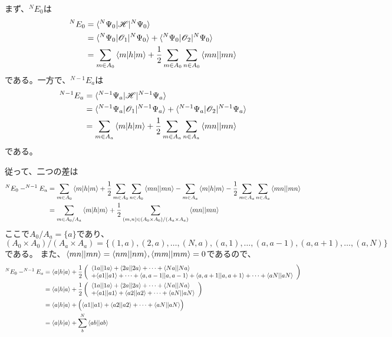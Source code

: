 まず、$^{N}E_0$は
\begin{align}
	^{N}E_0
&=
	\braket{^{N}\Psi_0|\mathscr{H}|^{N}\Psi_0} \\
%
%
&=
	\braket{^{N}\Psi_0|\mathscr{O}_1|^{N}\Psi_0}
	+
	\braket{^{N}\Psi_0|\mathscr{O}_2|^{N}\Psi_0} \\
%
%
&=
	\sum_{m\in A_0}
		\braket{m|h|m}
	+
	\frac{1}{2}
	\sum_{m\in A_0}
	\sum_{n\in A_0}
		\antitwo{mn}{mn}
\end{align}
である。一方で、$^{N-1}E_a$は
\begin{align}
	^{N-1}E_a
&=
	\braket{^{N-1}\Psi_a|\mathscr{H}|^{N-1}\Psi_a} \\
%
%
&=
	\braket{^{N-1}\Psi_a|\mathscr{O}_1|^{N-1}\Psi_a}
	+
	\braket{^{N-1}\Psi_a|\mathscr{O}_2|^{N-1}\Psi_a} \\
%
%
&=
	\sum_{m\in A_a}
		\braket{m|h|m}
	+
	\frac{1}{2}
	\sum_{m\in A_a}
	\sum_{n\in A_a}
		\antitwo{mn}{mn}
\end{align}
である。

従って、二つの差は
\begin{align}
	^{N}E_0
	-
	^{N-1}E_a
&=
	\sum_{m\in A_0}
		\braket{m|h|m}
	+
	\frac{1}{2}
	\sum_{m\in A_0}
	\sum_{n\in A_0}
		\antitwo{mn}{mn}
	-
	\sum_{m\in A_a}
		\braket{m|h|m}
	-
	\frac{1}{2}
	\sum_{m\in A_a}
	\sum_{n\in A_a}
		\antitwo{mn}{mn} \\
%
%
&=
	\sum_{m\in A_0/A_a}
		\braket{m|h|m}
	+
	\frac{1}{2}
	\sum_{(m,n)\in (A_0\times A_0) / (A_a\times A_a)}
		\antitwo{mn}{mn}
\end{align}
ここで$A_0/A_a=\{a\}$であり、
$(A_0\times A_0) / (A_a\times A_a) =\{(1,a),(2,a),\dots,(N,a),(a,1),\dots,(a,a-1),(a,a+1),\dots,(a,N)\}$である。
また、${\braket{mn||mn}}={\braket{nm||nm}},{\braket{mm||mm}}=0$であるので、
\begin{align}
		^{N}E_0
	-
	^{N-1}E_a
&=
	\braket{a|h|a}
	+
	\frac{1}{2}
	\left(
	\begin{array}{l}
		\antitwo{1a}{1a}
		+
		\antitwo{2a}{2a}
		+
		\dots
		+
		\antitwo{Na}{Na} \\
		+
		\antitwo{a1}{a1}
		+
		\dots
		+
		\antitwo{a,a-1}{a,a-1}
		+
		\antitwo{a,a+1}{a,a+1}
		+
		\dots
		+
		\antitwo{aN}{aN}
	\end{array}
	\right) \\
%
%
&=
	\braket{a|h|a}
	+
	\frac{1}{2}
	\left(
	\begin{array}{l}
		\antitwo{1a}{1a}
		+
		\antitwo{2a}{2a}
		+
		\dots
		+
		\antitwo{Na}{Na} \\
		+
		\antitwo{a1}{a1}
		+
		\antitwo{a2}{a2}
		+
		\dots
		+
		\antitwo{aN}{aN}
	\end{array}
	\right) \\
%
%
&=
	\braket{a|h|a}
	+
	\Bigl(
		\antitwo{a1}{a1}
		+
		\antitwo{a2}{a2}
		+
		\dots
		+
		\antitwo{aN}{aN}
	\Bigr) \\
%
%
&=
	\braket{a|h|a}
	+
	\sum_{b}^{N}
		\antitwo{ab}{ab}
\end{align}




